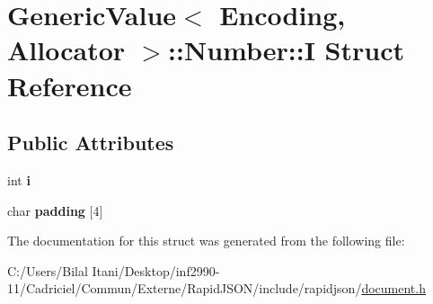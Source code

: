 \hypertarget{struct_generic_value_1_1_number_1_1_i}{}\section{Generic\+Value$<$ Encoding, Allocator $>$\+:\+:Number\+:\+:I Struct Reference}
\label{struct_generic_value_1_1_number_1_1_i}
\subsection*{Public Attributes}
\begin{DoxyCompactItemize}
\item 
int {\bfseries i}\hypertarget{struct_generic_value_1_1_number_1_1_i_ae0b250dc448d284cf9019f3932bfc380}{}\label{struct_generic_value_1_1_number_1_1_i_ae0b250dc448d284cf9019f3932bfc380}

\item 
char {\bfseries padding} \mbox{[}4\mbox{]}\hypertarget{struct_generic_value_1_1_number_1_1_i_aefc064997f30c9c0b2bdce187d1d4cce}{}\label{struct_generic_value_1_1_number_1_1_i_aefc064997f30c9c0b2bdce187d1d4cce}

\end{DoxyCompactItemize}


The documentation for this struct was generated from the following file\+:\begin{DoxyCompactItemize}
\item 
C\+:/\+Users/\+Bilal Itani/\+Desktop/inf2990-\/11/\+Cadriciel/\+Commun/\+Externe/\+Rapid\+J\+S\+O\+N/include/rapidjson/\hyperlink{document_8h}{document.\+h}\end{DoxyCompactItemize}
